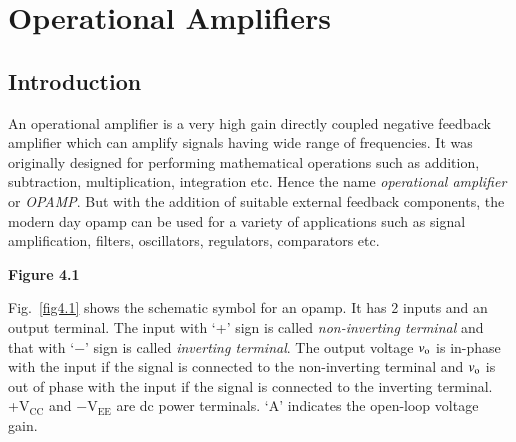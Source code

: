 \makeatletter
\def\@makechapterhead#1{%
  \vspace*{10\p@}%
  {\parindent \z@ \raggedleft \normalfont
    \ifnum \c@secnumdepth >\m@ne
      \if@mainmatter
        \LARGE\bfseries \@chapapp\space \thechapter
	\vskip 4pt
        \hrule height 2pt
        \par\nobreak
        \vskip 5\p@
      \fi
    \fi
    \interlinepenalty\@M
    \huge \bfseries #1\par\nobreak
\vskip 5pt

\hrule height 2pt   
 \vskip 10\p@  
  }}
\makeatother

\setcounter{chapter}{3}
\chapter{Operational Amplifiers}\label{chap4}

\section{Introduction}\label{sec4.1}

An operational amplifier is a very high gain directly coupled negative feedback amplifier which can amplify signals having wide range of frequencies. It was originally designed for performing mathematical operations such as addition, subtraction, multiplication, integration etc. Hence the name {\em operational amplifier} or {\em OPAMP}. But with the addition of suitable external feedback components, the modern day opamp can be used for a variety of applications such as signal amplification, filters, oscillators, regulators, comparators  etc.


\begin{center}
{\bf Figure 4.1}
\end{center}

Fig.~\ref{fig4.1} shows the schematic symbol for an opamp. It has 2 inputs and an output terminal. The input with `+' sign is called {\em non-inverting terminal} and that with `$-$' sign is called {\em inverting terminal}. The output voltage $v_{\textrm{o}}$ is in-phase with the input if the signal is connected to the non-inverting terminal and $v_{\textrm{o}}$ is out of phase with the input if the signal is connected to the inverting terminal. +V$_{\text{CC}}$ and $-$V$_{\text{EE}}$ are dc power terminals. `A' indicates the open-loop voltage gain.

